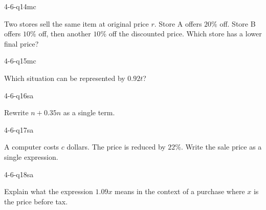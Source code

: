 \begin{practiceQuestion}{4-6-q14}{mc}
\begin{questionText}
Two stores sell the same item at original price $r$. Store A offers $20\%$ off. Store B offers $10\%$ off, then another $10\%$ off the discounted price. Which store has a lower final price?
\end{questionText}
\end{practiceQuestion}

\begin{practiceQuestion}{4-6-q15}{mc}
\begin{questionText}
Which situation can be represented by $0.92t$?
\end{questionText}
\end{practiceQuestion}


\begin{practiceQuestion}{4-6-q16}{sa}
\begin{questionText}
Rewrite $n + 0.35n$ as a single term.
\end{questionText}
\end{practiceQuestion}

\begin{practiceQuestion}{4-6-q17}{sa}
\begin{questionText}
A computer costs $c$ dollars. The price is reduced by $22\%$. Write the sale price as a single expression.
\end{questionText}
\end{practiceQuestion}

\begin{practiceQuestion}{4-6-q18}{sa}
\begin{questionText}
Explain what the expression $1.09x$ means in the context of a purchase where $x$ is the price before tax.
\end{questionText}
\end{practiceQuestion}

